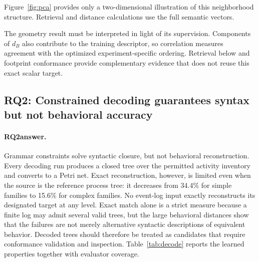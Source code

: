 \documentclass[pdflatex,sn-basic]{sn-jnl}
\newcommand{\RQtwo}{\textbf{RQ2}}
\begin{document}
Figure~\ref{fig:pca} provides only a two-dimensional illustration of this neighborhood structure. Retrieval and distance calculations use the full semantic vectors.



The geometry result must be interpreted in light of its supervision. Components of $d_B$ also contribute to the training descriptor, so correlation measures agreement with the optimized experiment-specific ordering. Retrieval below and footprint conformance provide complementary evidence that does not reuse this exact scalar target.

\FloatBarrier
\subsection{\RQtwo: Constrained decoding guarantees syntax but not behavioral accuracy}\label{sec:decode-results}

\paragraph{\RQtwo answer.}
Grammar constraints solve syntactic closure, but not behavioral reconstruction. Every decoding run produces a closed tree over the permitted activity inventory and converts to a Petri net. Exact reconstruction, however, is limited even when the source is the reference process tree: it decreases from 34.4\% for simple families to 15.6\% for complex families. No event-log input exactly reconstructs its designated target at any level. Exact match alone is a strict measure because a finite log may admit several valid trees, but the large behavioral distances show that the failures are not merely alternative syntactic descriptions of equivalent behavior. Decoded trees should therefore be treated as candidates that require conformance validation and inspection. Table~\ref{tab:decode} reports the learned properties together with evaluator coverage.
\end{document}
